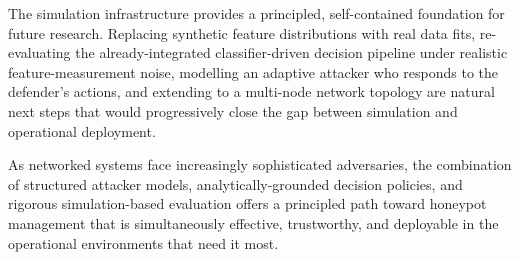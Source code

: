 The simulation infrastructure provides a principled, self-contained
foundation for future research.
Replacing synthetic feature distributions with real data fits, re-evaluating
the already-integrated classifier-driven decision pipeline under realistic
feature-measurement noise, modelling an adaptive attacker who responds to
the defender's actions, and extending to a multi-node network topology are
natural next steps that would progressively close the gap between
simulation and operational deployment.

As networked systems face increasingly sophisticated adversaries, the
combination of structured attacker models, analytically-grounded decision
policies, and rigorous simulation-based evaluation offers a principled path
toward honeypot management that is simultaneously effective, trustworthy,
and deployable in the operational environments that need it most.
